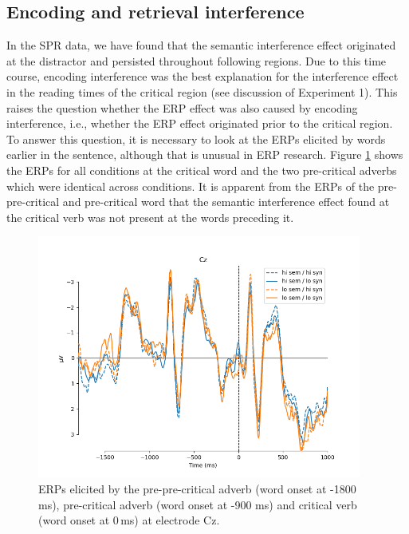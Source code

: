 \documentclass[a4paper, man, floatsintext]{apa7}
\begin{document}
\subsection{Encoding and retrieval interference}
In the SPR data, we have found that the semantic interference effect originated at the distractor and persisted throughout following regions. Due to this time course, encoding interference was the best explanation for the interference effect in the reading times of the critical region (see discussion of Experiment 1). This raises the question whether the ERP effect was also caused by encoding interference, i.e., whether the ERP effect originated prior to the critical region. To answer this question, it is necessary to look at the ERPs elicited by words earlier in the sentence, although that is unusual in ERP research. Figure \ref{fig:erp_precrit} shows the ERPs for all conditions at the critical word and the two pre-critical adverbs which were identical across conditions. It is apparent from the ERPs of the pre-pre-critical and pre-critical word that the semantic interference effect found at the critical verb was not present at the words preceding it. 

\begin{figure}[H]
    \caption{ERPs elicited by the pre-pre-critical adverb (word onset at -1800 ms), pre-critical adverb (word onset at -900 ms) and critical verb (word onset at 0\,ms) at electrode Cz.}
    \label{fig:erp_precrit}
    \centering
    \includegraphics[width=0.95\textwidth]{images/N_103_Cz_precrit.png}
\end{figure}
\end{document}
